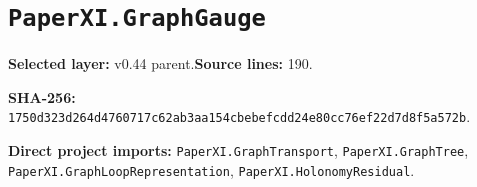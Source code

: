 \documentclass[10pt,oneside]{book}
\begin{document}
\section{\texorpdfstring{\nolinkurl{PaperXI.GraphGauge}}{PaperXI.GraphGauge}}\label{module:PaperXI.GraphGauge}

\textbf{Selected layer:} v0.44 parent.\quad\textbf{Source lines:} 190.\par\textbf{SHA-256:} {\scriptsize\nolinkurl{1750d323d264d4760717c62ab3aa154cbebefcdd24e80cc76ef22d7d8f5a572b}}.


\textbf{Direct project imports:} \nolinkurl{PaperXI.GraphTransport}, \nolinkurl{PaperXI.GraphTree}, \nolinkurl{PaperXI.GraphLoopRepresentation}, \nolinkurl{PaperXI.HolonomyResidual}.
\end{document}
